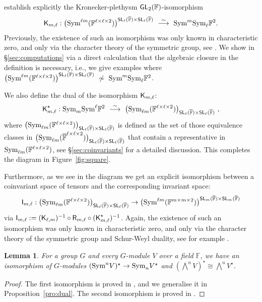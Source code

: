 \documentclass[a4paper]{extarticle}
\newcommand{\IF}{\mathbb{F}}
\newcommand{\oIF}{{\overline{\mathbb{F}}}}
\newcommand{\GL}{\textsf{\textup{GL}}}
\newcommand{\SL}{\textsf{\textup{SL}}}
\newcommand{\Wedge}{{\textstyle\bigwedge}}
\newcommand{\Sym}{\textup{Sym}}
\newcommand{\Hermite}{\textsf{\textup{R}}}
\newcommand{\KP}{\textsf{\textup{K}}}
\newcommand{\I}{\textsf{\textup{I}}}
\numberwithin{theorem}{section}
\newtheorem{lemma}[theorem]{Lemma}
\theoremstyle{definition}
\begin{document}
establish explicitly the Kronecker-plethysm $\GL_2(\IF)$-isomorphism
\[
\KP_{m,\ell} : \big(\Sym^{\ell m}(\IF^{\ell \times\ell \times 2})\big)^{\SL_\ell(\oIF)\times \SL_\ell(\oIF)}        \ \stackrel{\sim}{\longrightarrow} \      \Sym^m \Sym_\ell \IF^2   .
\]
Previously, the existence of such an isomorphism was only known in characteristic zero, and only via the character theory of the symmetric group, see \cite{PP:13,PP:14}.
We show in \S\ref{sec:computations} via a direct calculation that the algebraic closure in the definition is necessary,
i.e., we give examples where
$\big(\Sym^{\ell m}(\IF^{\ell \times\ell \times 2})\big)^{\SL_\ell(\IF)\times \SL_\ell(\IF)} \ \not\sim \ \Sym^m \Sym_\ell \IF^2$.
 
We also define the dual of the isomorphism $\KP_{m,\ell}$:
\[
\KP_{m,\ell}^\star :    \Sym_m \Sym^\ell \IF^2      \ \stackrel{\sim}{\longrightarrow} \ \big(\Sym_{\ell m}(\IF^{\ell \times\ell \times 2})\big)_{\SL_\ell(\oIF)\times \SL_\ell(\oIF)}    \ ,
\]
where
$\big(\Sym_{\ell m}(\IF^{\ell \times\ell \times 2})\big)_{\SL_\ell(\oIF)\times \SL_\ell(\oIF)}$
is defined as the set of those equivalence classes in
$\big(\Sym_{\ell m}(\oIF^{\ell \times\ell \times 2})\big)_{\SL_\ell(\oIF)\times \SL_\ell(\oIF)}$
that contain a representative in $\Sym_{\ell m}(\IF^{\ell \times\ell \times 2})$, see \S\ref{sec:coinvariants} for a detailed discussion.
This completes the diagram in Figure~\ref{fig:square}.
 
Furthermore, as we see in the diagram we get an explicit isomorphism between a coinvariant space of tensors and the corresponding invariant space:
\[
\I_{m,\ell} : \big(\Sym_{\ell m}(\IF^{\ell \times\ell \times 2})\big)_{\SL_\ell(\oIF)\times \SL_\ell(\oIF)} \to \big(\Sym^{\ell m}(\IF^{m \times m \times 2})\big)^{\SL_m(\oIF)\times \SL_m(\oIF)}
\]
via $\I_{m,\ell} := (\KP_{\ell,m})^{-1}\circ\Hermite_{m,\ell}\circ(\KP_{m,\ell}^\star)^{-1}$.
Again, the existence of such an isomorphism was only known in characteristic zero, and only via the character theory of the symmetric group and Schur-Weyl duality, see for example \cite[Lem.~4.4.7]{Ike:12}.



\begin{lemma}\label{lem:duality}
For a group $G$ and every $G$-module $V$ over a field $\IF$, we have an isomorphism of $G$-modules $(\Sym^nV)^\star\to \Sym_n V^\star$ and $(\Wedge^n V)^\star\cong \Wedge^n V^\star$.
\end{lemma}
\begin{proof}
The first isomorphism is proved in \cite[Prop.~3.7]{McD21}, and we generalise it in Proposition~\ref{pro:dual}.
The second isomorphism is proved in \cite[Lem.~3.1]{MW:22}.
\end{proof}
\end{document}
